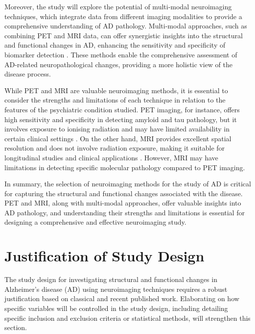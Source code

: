 \documentclass[10pt]{article}
\begin{document}
\begin{sloppypar}
  Moreover, the study will explore the potential of multi-modal neuroimaging techniques, which integrate data from different imaging modalities to provide a comprehensive understanding of AD pathology. Multi-modal approaches, such as combining PET and MRI data, can offer synergistic insights into the structural and functional changes in AD, enhancing the sensitivity and specificity of biomarker detection \citep{ran_multimodal_2022}. These methods enable the comprehensive assessment of AD-related neuropathological changes, providing a more holistic view of the disease process.

  While PET and MRI are valuable neuroimaging methods, it is essential to consider the strengths and limitations of each technique in relation to the features of the psychiatric condition studied. PET imaging, for instance, offers high sensitivity and specificity in detecting amyloid and tau pathology, but it involves exposure to ionising radiation and may have limited availability in certain clinical settings \citep{bao_pet_2021}. On the other hand, MRI provides excellent spatial resolution and does not involve radiation exposure, making it suitable for longitudinal studies and clinical applications \citep{cai_magnetic_2020}. However, MRI may have limitations in detecting specific molecular pathology compared to PET imaging.

  In summary, the selection of neuroimaging methods for the study of AD is critical for capturing the structural and functional changes associated with the disease. PET and MRI, along with multi-modal approaches, offer valuable insights into AD pathology, and understanding their strengths and limitations is essential for designing a comprehensive and effective neuroimaging study.

  \section{Justification of Study Design}
  \label{sec:justification-of-study-design}

  The study design for investigating structural and functional changes in Alzheimer's disease (AD) using neuroimaging techniques requires a robust justification based on classical and recent published work. Elaborating on how specific variables will be controlled in the study design, including detailing specific inclusion and exclusion criteria or statistical methods, will strengthen this section.


\end{sloppypar}
\end{document}
